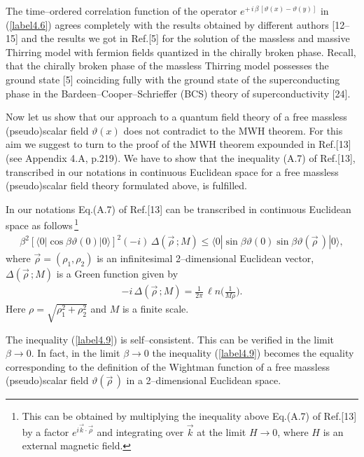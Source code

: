 \documentclass[a4paper,12pt] {article}
\begin{document}
The time--ordered correlation function of the operator $e^{\textstyle
+\,i\,\beta\,[\vartheta(x) - \vartheta(y)]}$ in (\ref{label4.6})
agrees completely with the results obtained by different authors
[12--15] and the results we got in Ref.[5] for the solution of the
massless and massive Thirring model with fermion fields quantized in
the chirally broken phase. Recall, that the chirally broken phase of
the massless Thirring model possesses the ground state [5] coinciding
fully with the ground state of the superconducting phase in the
Bardeen--Cooper--Schrieffer (BCS) theory of superconductivity [24].

Now let us show that our approach to a quantum field theory of a free
massless (pseudo)scalar field $\vartheta(x)$ does not contradict to
the MWH theorem. For this aim we suggest to turn to the proof of the
MWH theorem expounded in Ref.[13] (see Appendix 4.A, p.219). We have
to show that the inequality (A.7) of Ref.[13], transcribed in our
notations in continuous Euclidean space for a free massless
(pseudo)scalar field theory formulated above, is fulfilled.

In our notations Eq.(A.7) of Ref.[13] can be transcribed in continuous
Euclidean space as follows\,\footnote{This can be obtained by
multiplying the inequality above Eq.(A.7) of Ref.[13] by a factor
$e^{\textstyle i\vec{k}\cdot \vec{\rho}}$ and integrating over
$\vec{k}$ at the limit $H \to 0$, where $H$ is an external magnetic
field.}
%
\begin{eqnarray}\label{label4.9}
\beta^2[\langle 0|\cos\beta\vartheta(0)|0\rangle]^2
(-i)\,\Delta(\vec{\rho}\,; M) \le \langle
0|\sin\beta\vartheta(0)\sin\beta\vartheta(\vec{\rho}\,)|0\rangle,
\end{eqnarray}
%
where $\vec{\rho} = (\rho_1,\rho_2)$ is an infinitesimal
2--dimensional Euclidean vector, $\Delta(\vec{\rho}\,; M)$ is a Green
function given by
%
\begin{eqnarray}\label{label4.10}
- i\,\Delta(\vec{\rho}\,; M) = \frac{1}{2\pi}\,{\ell
n}\Bigg(\frac{1}{M\rho}\Bigg).
\end{eqnarray}
%
Here $\rho = \sqrt{\rho^2_1 + \rho^2_2}$ and $M$ is a finite scale.

The inequality (\ref{label4.9}) is self--consistent. This can be
verified in the limit $\beta \to 0$. In fact, in the limit $\beta \to
0$ the inequality (\ref{label4.9}) becomes the equality corresponding
to the definition of the Wightman function of a free massless
(pseudo)scalar field $\vartheta(\vec{\rho}\,)$ in a 2--dimensional
Euclidean space.
\end{document}
